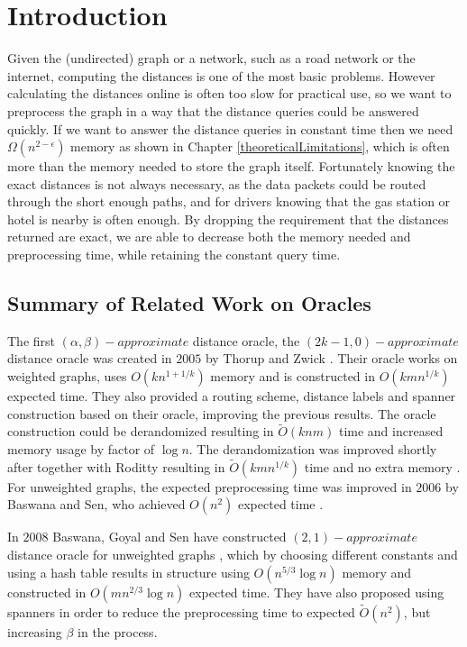 \documentclass[shortabstract, lic, english]{iithesis}
\author         {Artur Błaszkiewicz}
\theoremstyle{definition} \newtheorem{definition}{Definition}[chapter]
\theoremstyle{plain} \newtheorem{remark}[definition]{Observation}
\theoremstyle{plain} \newtheorem{theorem}[definition]{Theorem}
\theoremstyle{plain} \newtheorem{lemma}[definition]{Lemma}
\theoremstyle{plain} \newtheorem{conjecture}[definition]{Conjecture}
\begin{document}

\chapter{Introduction}

Given the (undirected) graph or a network, such as a road network or the internet, computing the distances is one of the most basic problems.
However calculating the distances online is often too slow for practical use, so we want to preprocess the graph in a way that the distance queries could be answered quickly.
If we want to answer the distance queries in constant time then we need $\Omega(n^{2 - \epsilon})$ memory as shown in Chapter \ref{theoreticalLimitations},
which is often more than the memory needed to store the graph itself.
Fortunately knowing the exact distances is not always necessary, as the data packets could be routed through the short enough paths,
and for drivers knowing that the gas station or hotel is nearby is often enough. By dropping the requirement that the distances returned are exact,
we are able to decrease both the memory needed and preprocessing time, while retaining the constant query time.

\section{Summary of Related Work on Oracles}

The first $(\alpha,\beta)-approximate$ distance oracle, the $(2k-1, 0)-approximate$ distance oracle was created in $2005$ by Thorup and Zwick \cite{a0OraclesBasic}.
Their oracle works on weighted graphs, uses $O(kn^{1+1/k})$ memory and is constructed in $O(kmn^{1/k})$ expected time.
They also provided a routing scheme, distance labels and spanner construction based on their oracle, improving the previous results.
The oracle construction could be derandomized resulting in $\tilde{O}(knm)$ time and increased memory usage by factor of $\log n$.
The derandomization was improved shortly after together with Roditty resulting in $\tilde{O}(kmn^{1/k})$ time and no extra memory \cite{a0OraclesMN1KDeterministicTime}.
For unweighted graphs, the expected preprocessing time was improved in $2006$ by Baswana and Sen, who achieved $O(n^2)$ expected time \cite{a0OraclesN2Time}.

In $2008$ Baswana, Goyal and Sen have constructed $(2,1)-approximate$ distance oracle for unweighted graphs \cite{21OracleBasic}, which by choosing different constants and using a hash table results in
structure using $O(n^{5/3} \log n)$ memory and constructed in $O(mn^{2/3} \log n)$ expected time.
They have also proposed using spanners in order to reduce the preprocessing time to expected $\tilde{O}(n^2)$, but increasing $\beta$ in the process.
\end{document}
